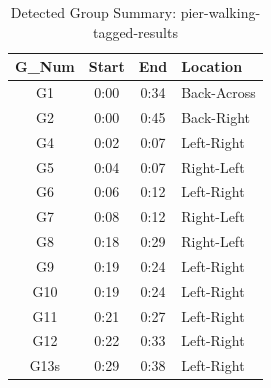 \begin{table}[H]
    \centering
    \caption{Detected Group Summary: pier-walking-tagged-results}
    \label{tab:group-summary-3}
    \begin{tabular}{c c c l}
        \toprule
        \textbf{G\_Num} & \textbf{Start} & \textbf{End} & \textbf{Location} \\
        \midrule
        G1 & 0:00 & 0:34 & Back-Across \\
        G2 & 0:00 & 0:45 & Back-Right \\
        G4 & 0:02 & 0:07 & Left-Right \\
        G5 & 0:04 & 0:07 & Right-Left \\
        G6 & 0:06 & 0:12 & Left-Right \\
        G7 & 0:08 & 0:12 & Right-Left \\
        G8 & 0:18 & 0:29 & Right-Left \\
        G9 & 0:19 & 0:24 & Left-Right \\
        G10 & 0:19 & 0:24 & Left-Right \\
        G11 & 0:21 & 0:27 & Left-Right \\
        G12 & 0:22 & 0:33 & Left-Right \\
        G13s & 0:29 & 0:38 & Left-Right \\
        \bottomrule
    \end{tabular}
\end{table}
